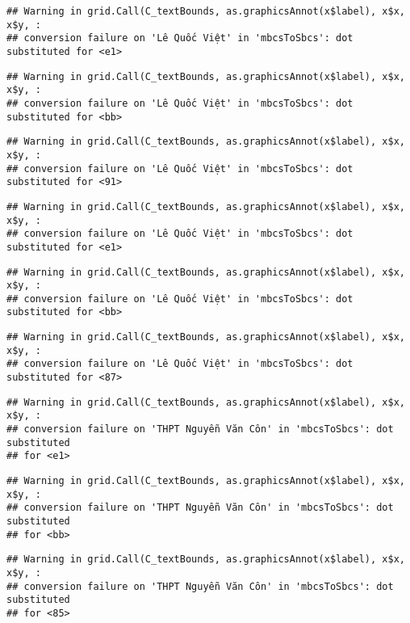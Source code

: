 \documentclass[
]{article}
\begin{document}
\begin{verbatim}
## Warning in grid.Call(C_textBounds, as.graphicsAnnot(x$label), x$x, x$y, :
## conversion failure on 'Lê Quốc Việt' in 'mbcsToSbcs': dot substituted for <e1>
\end{verbatim}

\begin{verbatim}
## Warning in grid.Call(C_textBounds, as.graphicsAnnot(x$label), x$x, x$y, :
## conversion failure on 'Lê Quốc Việt' in 'mbcsToSbcs': dot substituted for <bb>
\end{verbatim}

\begin{verbatim}
## Warning in grid.Call(C_textBounds, as.graphicsAnnot(x$label), x$x, x$y, :
## conversion failure on 'Lê Quốc Việt' in 'mbcsToSbcs': dot substituted for <91>
\end{verbatim}

\begin{verbatim}
## Warning in grid.Call(C_textBounds, as.graphicsAnnot(x$label), x$x, x$y, :
## conversion failure on 'Lê Quốc Việt' in 'mbcsToSbcs': dot substituted for <e1>
\end{verbatim}

\begin{verbatim}
## Warning in grid.Call(C_textBounds, as.graphicsAnnot(x$label), x$x, x$y, :
## conversion failure on 'Lê Quốc Việt' in 'mbcsToSbcs': dot substituted for <bb>
\end{verbatim}

\begin{verbatim}
## Warning in grid.Call(C_textBounds, as.graphicsAnnot(x$label), x$x, x$y, :
## conversion failure on 'Lê Quốc Việt' in 'mbcsToSbcs': dot substituted for <87>
\end{verbatim}

\begin{verbatim}
## Warning in grid.Call(C_textBounds, as.graphicsAnnot(x$label), x$x, x$y, :
## conversion failure on 'THPT Nguyễn Văn Côn' in 'mbcsToSbcs': dot substituted
## for <e1>
\end{verbatim}

\begin{verbatim}
## Warning in grid.Call(C_textBounds, as.graphicsAnnot(x$label), x$x, x$y, :
## conversion failure on 'THPT Nguyễn Văn Côn' in 'mbcsToSbcs': dot substituted
## for <bb>
\end{verbatim}

\begin{verbatim}
## Warning in grid.Call(C_textBounds, as.graphicsAnnot(x$label), x$x, x$y, :
## conversion failure on 'THPT Nguyễn Văn Côn' in 'mbcsToSbcs': dot substituted
## for <85>
\end{verbatim}
\end{document}
